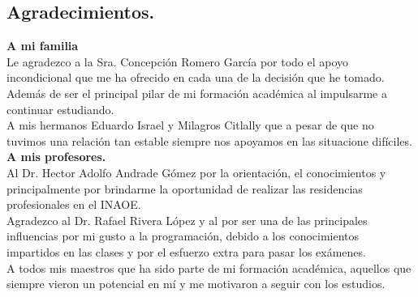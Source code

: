 \begin{center}
	\section*{Agradecimientos.}   
\end{center}
\setcounter{page}{1}

\textbf{A mi familia}
\\

Le agradezco a la Sra. Concepción Romero García por todo el apoyo incondicional que me ha ofrecido en cada una de la decisión que he tomado. Además de ser el principal pilar de mi formación académica al impulsarme a continuar estudiando.
\\

A mis hermanos Eduardo Israel y Milagros Citlally que a pesar de que no tuvimos una relación tan estable siempre nos apoyamos en las situacione difíciles.
\\

\textbf{A mis profesores.}
\\

Al Dr. Hector Adolfo Andrade Gómez por la orientación, el conocimientos  y principalmente por brindarme la oportunidad de realizar las residencias profesionales en el INAOE.
\\

Agradezco al Dr. Rafael Rivera López y al por ser una de las principales influencias por mi gusto a la programación, debido a los conocimientos impartidos en las clases y por el esfuerzo extra para pasar los exámenes.
\\

A todos mis maestros que ha sido parte de mi formación académica, aquellos que siempre vieron un potencial en mí y me motivaron a seguir con los estudios.
